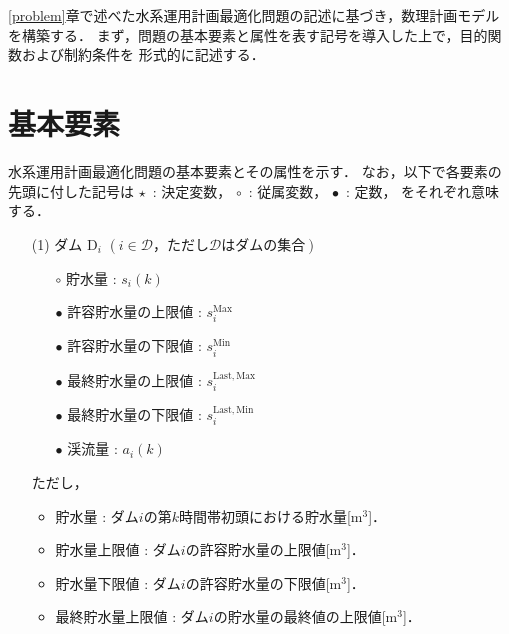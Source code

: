 \ref{problem}章で述べた水系運用計画最適化問題の記述に基づき，数理計画モデルを構築する．
まず，問題の基本要素と属性を表す記号を導入した上で，目的関数および制約条件を%
形式的に記述する．
\section{基本要素}
水系運用計画最適化問題の基本要素とその属性を示す．
なお，以下で各要素の先頭に付した記号は
$\star$\, : 決定変数，
$\circ$\, : 従属変数，
$\bullet$\, : 定数，
をそれぞれ意味する．

\begin{itemize}
\item[(1)]
	ダム $ \mathrm{D}_i $ $(i \in \mathcal{D}，ただし\mathcal{D}はダムの集合) $
	\begin{itemize}
		\item[$\circ$] 
			貯水量 : $s_i(k)$
		\item[$\bullet$] 
			許容貯水量の上限値 : $s_{i}^{\mathrm{Max}}$
		\item[$\bullet$] 
			許容貯水量の下限値 : $s_{i}^{\mathrm{Min}}$
		\item[$\bullet$] 
			最終貯水量の上限値 : $s_{i}^{\mathrm{Last,Max}}$
		\item[$\bullet$] 
			最終貯水量の下限値 : $s_{i}^{\mathrm{Last,Min}}$
		\item[$\bullet$]  
			渓流量 : $a_i(k)$
	\end{itemize}
	ただし，
	\begin{itemize}
		\item 貯水量 : ダム$i$の第$k$時間帯初頭における貯水量[$\mathrm m^3$]．
		\item 貯水量上限値 : ダム$i$の許容貯水量の上限値[$\mathrm m^3$]．
		\item 貯水量下限値 : ダム$i$の許容貯水量の下限値[$\mathrm m^3$]．
		\item 最終貯水量上限値 : ダム$i$の貯水量の最終値の上限値[$\mathrm m^3$]．

\end{itemize}
\end{itemize}
